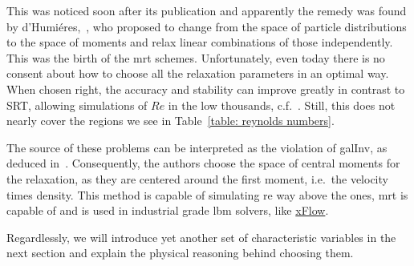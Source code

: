 This was noticed soon after its publication and apparently the remedy was found by d'Humiéres,~\cite{d1994generalized}, who proposed to change from the space of particle distributions to the space of moments and relax linear combinations of those independently.
This was the birth of the \gls{mrt} schemes.
Unfortunately, even today there is no consent about how to choose all the relaxation parameters in an optimal way.
When chosen right, the accuracy and stability can improve greatly in contrast to SRT, allowing simulations of $Re$ in the low thousands, c.f.~\cite{d2002multiple}.
Still, this does not nearly cover the regions we see in Table~\ref{table: reynolds numbers}.

The source of these problems can be interpreted as the violation of \gls{galInv}, as deduced in~\cite{geier2006cascaded}. Consequently, the authors choose the space of central moments for the relaxation, as they are centered around the first moment, i.e.\ the velocity times density.
This method is capable of simulating \gls{re} way above the ones, \gls{mrt} is capable of and is used in industrial grade \gls{lbm} solvers, like \href{http://www.xflowcfd.com/technology/view/cfd}{xFlow}.

Regardlessly, we will introduce yet another set of characteristic variables in the next section and explain the physical reasoning behind choosing them.
